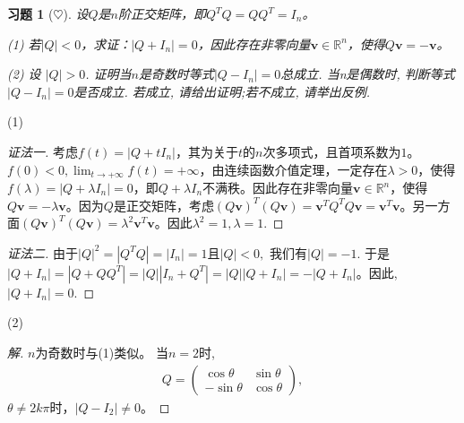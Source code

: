 \documentclass[UTF8]{ctexart}
\newtheorem{ex}[thm]{习题}
\begin{document}
\begin{ex}[$\heartsuit $]
设$Q$是$n$阶正交矩阵，即$Q^TQ=QQ^T=I_n$。

(1) 若$|Q|<0$，求证：$|Q+I_n|=0$，因此存在非零向量$\mathbf{v} \in \mathbb{R}^n$，使得$Q\mathbf{v}=-\mathbf{v}$。

(2) 设 $|Q|>0$. 证明当$n$是奇数时等式$|Q-I_n|=0$总成立. 当n是偶数时, 判断等式$|Q-I_n|=0$是否成立. 若成立, 请给出证明;若不成立, 请举出反例.
\end{ex}

(1)\begin{proof}[证法一]考虑$f(t)=|Q+tI_n|$，其为关于$t$的$n$次多项式，且首项系数为$1$。$f(0)<0, \lim_{t \rightarrow +\infty}f(t)=+\infty$，由连续函数介值定理，一定存在$\lambda >0$，使得$f(\lambda)=|Q+\lambda I_n|=0$，即$Q+\lambda I_n$不满秩。因此存在非零向量$\mathbf{v} \in \mathbb{R}^n$，使得$Q\mathbf{v}=-\lambda \mathbf{v}$。因为$Q$是正交矩阵，考虑$(Q\mathbf{v})^T(Q\mathbf{v})=\mathbf{v}^TQ^TQ\mathbf{v}=\mathbf{v}^T \mathbf{v}$。另一方面$(Q\mathbf{v})^T(Q\mathbf{v})= \lambda^2 \mathbf{v}^T \mathbf{v}$。因此$\lambda^2=1, \lambda=1$.
\end{proof}
\begin{proof}[证法二]由于$|Q|^2 = |Q^TQ | = |I_n| = 1$且$|Q|<0,$ 我们有$|Q| = -1.$ 于是$|Q + I_n| = |Q + Q Q^T| = |Q| |I_n + Q^T| = |Q| |Q +I_n | = - |Q+I_n|$。因此,$|Q+I_n| = 0.$
\end{proof}
(2) \begin{proof}[解]

$n$为奇数时与(1)类似。
当$n=2$时,
\begin{eqnarray*}
Q=\left(\begin{array}{cc}
\cos \theta & \sin \theta\\
-\sin \theta & \cos \theta
\end{array}\right),
\end{eqnarray*}
$\theta \neq 2k\pi$时，$|Q-I_2| \neq 0$。
\end{proof}
\end{document}
